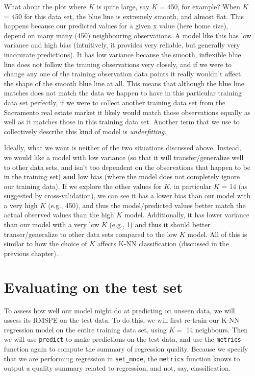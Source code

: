 \documentclass[
]{krantz}
\begin{document}
What about the plot where \(K\) is quite large, say \(K\) = 450, for example? When
\(K\) = 450 for this data set, the blue line is extremely smooth, and almost
flat. This happens because our predicted values for a given x value (here home
size), depend on many many (450) neighbouring observations. A model
like this has low variance and high bias (intuitively, it provides very reliable,
but generally very inaccurate predictions). It has low variance because the
smooth, inflexible blue line does not follow the training observations very
closely, and if we were to change any one of the training observation data
points it really wouldn't affect the shape of the smooth blue line at all. This
means that although the blue line matches does not match the data we happen to
have in this particular training data set perfectly, if we were to collect
another training data set from the Sacramento real estate market it likely
would match those observations equally as well as it matches those in this
training data set. Another term that
we use to collectively describe this kind of model is \emph{underfitting}.

Ideally, what we want is neither of the two situations discussed above. Instead,
we would like a model with low variance (so that it will transfer/generalize
well to other data sets, and isn't too dependent on the
observations that happen to be in the training set) \textbf{and} low bias
(where the model does not completely ignore our training data). If we explore
the other values for \(K\), in particular \(K\) = 14
(as suggested by cross-validation),
we can see it has a lower bias than our model with a very high \(K\) (e.g., 450),
and thus the model/predicted values better match the actual observed values
than the high \(K\) model. Additionally, it has lower variance than our model
with a very low \(K\) (e.g., 1) and thus it should better transer/generalize to
other data sets compared to the low \(K\) model. All of this is similar to how
the choice of \(K\) affects K-NN classification (discussed in the previous
chapter).

\hypertarget{evaluating-on-the-test-set}{%
\section{Evaluating on the test set}\label{evaluating-on-the-test-set}}

To assess how well our model might do at predicting on unseen data, we will
assess its RMSPE on the test data. To do this, we will first
re-train our K-NN regression model on the entire training data set,
using \(K =\) 14 neighbours. Then we will
use \texttt{predict} to make predictions on the test data, and use the \texttt{metrics}
function again to compute the summary of regression quality. Because
we specify that we are performing regression in \texttt{set\_mode}, the \texttt{metrics}
function knows to output a quality summary related to regression, and not, say, classification.
\end{document}
